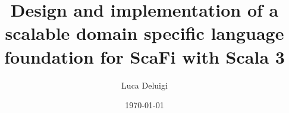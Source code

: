 \documentclass[12pt,a4paper,openright,twoside]{book}
\title{Design and implementation of a scalable domain specific language foundation for ScaFi with Scala 3}
\author{Luca Deluigi}
\date{\today}
\begin{document}
\frontmatter\frontispiece







\tableofcontents   
\listoffigures     %
\lstlistoflistings %

\mainmatter


















\backmatter

\nocite{*} %



\end{document}
